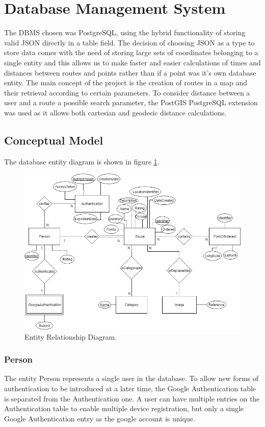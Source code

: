 \section*{Database Management System}
The DBMS chosen was PostgreSQL\cite{postgresql}, using the hybrid functionality 
of storing valid JSON\cite{postgresqljson} directly in a table field. The decision of choosing JSON as a type to 
store data comes with the need of storing large sets of coordinates belonging to a single entity and this 
allows us to make faster and easier calculations of times and distances between routes and points rather than if a 
point was it's own database entity. 
The main concept of the project is the creation of routes in a map and their retrieval according to certain parameters.
To consider distance between a user and a route a possible search parameter, the PostGIS\cite{postgis} 
PostgreSQL extension was used as it allows both cartesian and geodesic distance calculations.

    \subsection*{Conceptual Model}
    The database entity diagram is shown in figure \ref{fig:erdiagram}.

    \begin{figure}[ht]            
        \includegraphics[width=\textwidth]{images/project-structure/dbms-structure.PNG}
        \caption{Entity Relationship Diagram.}
        \label{fig:erdiagram}
    \end{figure}   

        \subsubsection*{Person}
        The entity Person represents a single user in the database. To allow new forms of authentication to be introduced at a later time,
        the Google Authentication table is separated from the Authentication one. A user can have multiple entries
        on the Authentication table to enable multiple device registration, but only a single Google Authentication 
        entry as the google account is unique.

